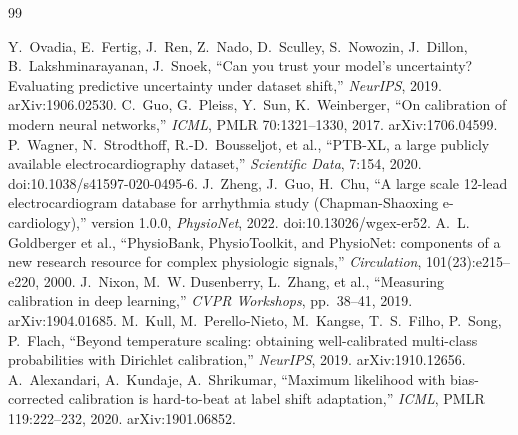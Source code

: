 \begin{thebibliography}{99}
\raggedright
 Y.~Ovadia, E.~Fertig, J.~Ren, Z.~Nado,
D.~Sculley, S.~Nowozin, J.~Dillon, B.~Lakshminarayanan, J.~Snoek,
``Can you trust your model's uncertainty? Evaluating predictive
uncertainty under dataset shift,'' \emph{NeurIPS}, 2019.
arXiv:1906.02530.
 C.~Guo, G.~Pleiss, Y.~Sun, K.~Weinberger,
``On calibration of modern neural networks,'' \emph{ICML}, PMLR
70:1321--1330, 2017. arXiv:1706.04599.
 P.~Wagner, N.~Strodthoff, R.-D.~Bousseljot,
et al., ``PTB-XL, a large publicly available electrocardiography
dataset,'' \emph{Scientific Data}, 7:154, 2020.
doi:10.1038/s41597-020-0495-6.
 J.~Zheng, J.~Guo, H.~Chu,
``A large scale 12-lead electrocardiogram database for arrhythmia
study (Chapman-Shaoxing e-cardiology),'' version 1.0.0,
\emph{PhysioNet}, 2022. doi:10.13026/wgex-er52.
 A.~L. Goldberger et al., ``PhysioBank,
PhysioToolkit, and PhysioNet: components of a new research resource
for complex physiologic signals,'' \emph{Circulation},
101(23):e215--e220, 2000.
 J.~Nixon, M.~W. Dusenberry, L.~Zhang, et al.,
``Measuring calibration in deep learning,'' \emph{CVPR Workshops},
pp.~38--41, 2019. arXiv:1904.01685.
 M.~Kull, M.~Perello-Nieto, M.~Kangse,
T.~S.~Filho, P.~Song, P.~Flach, ``Beyond temperature scaling:
obtaining well-calibrated multi-class probabilities with Dirichlet
calibration,'' \emph{NeurIPS}, 2019. arXiv:1910.12656.
 A.~Alexandari, A.~Kundaje, A.~Shrikumar,
``Maximum likelihood with bias-corrected calibration is hard-to-beat
at label shift adaptation,'' \emph{ICML}, PMLR 119:222--232, 2020.
arXiv:1901.06852.

\end{thebibliography}
